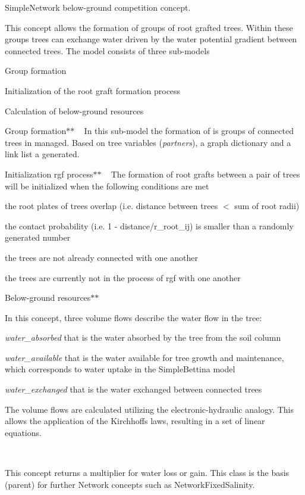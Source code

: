 Simple\+Network below-\/ground competition concept.

This concept allows the formation of groups of root grafted trees. Within these groups trees can exchange water driven by the water potential gradient between connected trees. The model consists of three \textquotesingle{}sub-\/models\textquotesingle{} ~\newline

\begin{DoxyItemize}
\item Group formation
\item Initialization of the root graft formation process
\item Calculation of below-\/ground resources

Group formation$\ast$$\ast$ ~\newline
 In this sub-\/model the formation of is groups of connected trees in managed. Based on tree variables ({\itshape partners}), a graph dictionary and a link list a generated.

Initialization rgf process$\ast$$\ast$ ~\newline
 The formation of root grafts between a pair of trees will be initialized when the following conditions are met ~\newline

\item the root plates of trees overlap (i.\+e. distance between trees $<$ sum of root radii)
\item the contact probability (i.\+e. 1 -\/ distance/r\+\_\+root\+\_\+ij) is smaller than a randomly generated number
\item the trees are not already connected with one another
\item the trees are currently not in the process of rgf with one another

Below-\/ground resources$\ast$$\ast$
\end{DoxyItemize}

In this concept, three volume flows describe the water flow in the tree\+: ~\newline

\begin{DoxyItemize}
\item {\itshape water\+\_\+absorbed} that is the water absorbed by the tree from the soil column
\item {\itshape water\+\_\+available} that is the water available for tree growth and maintenance, which corresponds to water uptake in the Simple\+Bettina model
\item {\itshape water\+\_\+exchanged} that is the water exchanged between connected trees
\end{DoxyItemize}

The volume flows are calculated utilizing the electronic-\/hydraulic analogy. This allows the application of the Kirchhoff\textquotesingle{}s laws, resulting in a set of linear equations.

~\newline


This concept returns a multiplier for water loss or gain. This class is the basis (parent) for further Network concepts such as Network\+Fixed\+Salinity. 